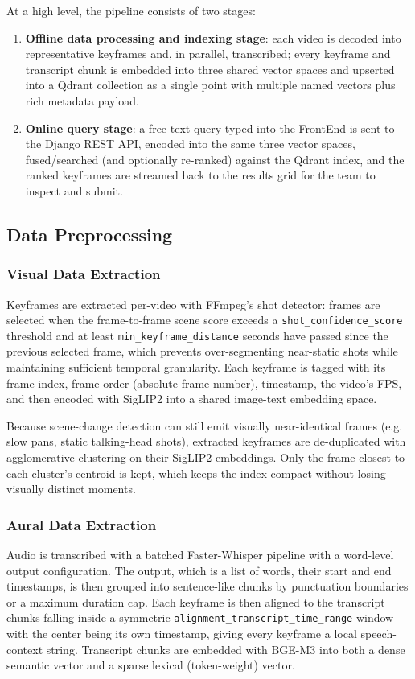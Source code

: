 \documentclass[11pt,a4paper]{article}
\begin{document}
At a high level, the pipeline consists of two stages:
\begin{enumerate}[leftmargin=1.5em]
    \item \textbf{Offline data processing and indexing stage}: each video is decoded into representative keyframes and, in parallel, transcribed; every keyframe and transcript chunk is embedded into three shared vector spaces and upserted into a Qdrant collection as a single point with multiple named vectors plus rich metadata payload.
    \item \textbf{Online query stage}: a free-text query typed into the FrontEnd is sent to the Django REST API, encoded into the same three vector spaces, fused/searched (and optionally re-ranked) against the Qdrant index, and the ranked keyframes are streamed back to the results grid for the team to inspect and submit.
\end{enumerate}

\subsection{Data Preprocessing}
\subsubsection{Visual Data Extraction}
Keyframes are extracted per-video with FFmpeg's shot detector: frames are selected when the frame-to-frame scene score exceeds a \texttt{shot\_confidence\_score} threshold and at least \texttt{min\_keyframe\_distance} seconds have passed since the previous selected frame, which prevents over-segmenting near-static shots while maintaining sufficient temporal granularity. Each keyframe is tagged with its frame index, frame order (absolute frame number), timestamp, the video's FPS, and then encoded with SigLIP2 into a shared image-text embedding space.

Because scene-change detection can still emit visually near-identical frames (e.g. slow pans, static talking-head shots), extracted keyframes are de-duplicated with agglomerative clustering on their SigLIP2 embeddings. Only the frame closest to each cluster's centroid is kept, which keeps the index compact without losing visually distinct moments.

\subsubsection{Aural Data Extraction}
Audio is transcribed with a batched Faster-Whisper pipeline with a word-level output configuration. The output, which is a list of words, their start and end timestamps, is then grouped into sentence-like chunks by punctuation boundaries or a maximum duration cap. Each keyframe is then aligned to the transcript chunks falling inside a symmetric \texttt{alignment\_transcript\_time\_range} window with the center being its own timestamp, giving every keyframe a local speech-context string. Transcript chunks are embedded with BGE-M3 into both a dense semantic vector and a sparse lexical (token-weight) vector.
\end{document}
